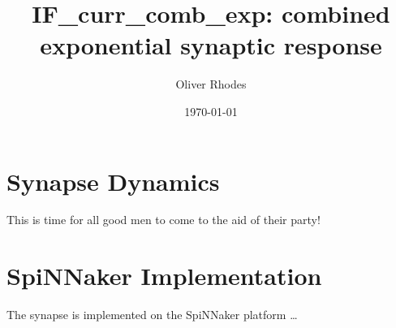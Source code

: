 \documentclass[12pt]{article}
\title{IF\_curr\_comb\_exp: combined exponential synaptic response}
\author{Oliver Rhodes}
\date{\today}
\begin{document}
\maketitle

\section{Synapse Dynamics}
This is time for all good men to come to the aid of their party!


\section{SpiNNaker Implementation}
The synapse is implemented on the SpiNNaker platform \ldots
\end{document}

